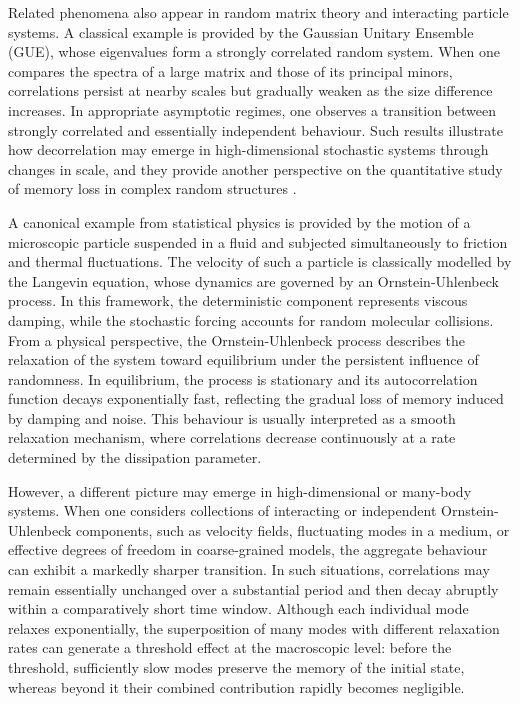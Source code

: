 \documentclass[12pt,thmsa]{article}
\begin{document}
Related phenomena also appear in random matrix theory and interacting particle systems. A classical example is provided by the Gaussian Unitary Ensemble (GUE), whose eigenvalues form a strongly correlated random system. When one compares the spectra of a large matrix and those of its principal minors, correlations persist at nearby scales but gradually weaken as the size difference increases. In appropriate asymptotic regimes, one observes a transition between strongly correlated and essentially independent behaviour. Such results illustrate how decorrelation may emerge in high-dimensional stochastic systems through changes in scale, and they provide another perspective on the quantitative study of memory loss in complex random structures \cite{Ferr,Bao,Forr}.

A canonical example from statistical physics is provided by the motion of a microscopic particle suspended in a fluid and subjected simultaneously to friction and thermal fluctuations. The velocity of such a particle is classically modelled by the Langevin equation, whose dynamics are governed by an Ornstein-Uhlenbeck process. In this framework, the deterministic component represents viscous damping, while the stochastic forcing accounts for random molecular collisions. From a physical perspective, the Ornstein-Uhlenbeck process describes the relaxation of the system toward equilibrium under the persistent influence of randomness. In equilibrium, the process is stationary and its autocorrelation function decays exponentially fast, reflecting the gradual loss of memory induced by damping and noise. This behaviour is usually interpreted as a smooth relaxation mechanism, where correlations decrease continuously at a rate determined by the dissipation parameter.

However, a different picture may emerge in high-dimensional or many-body systems. When one considers collections of interacting or independent Ornstein-Uhlenbeck components, such as velocity fields, fluctuating modes in a medium, or effective degrees of freedom in coarse-grained models, the aggregate behaviour can exhibit a markedly sharper transition. In such situations, correlations may remain essentially unchanged over a substantial period and then decay abruptly within a comparatively short time window. Although each individual mode relaxes exponentially, the superposition of many modes with different relaxation rates can generate a threshold effect at the macroscopic level: before the threshold, sufficiently slow modes preserve the memory of the initial state, whereas beyond it their combined contribution rapidly becomes negligible.
\end{document}
